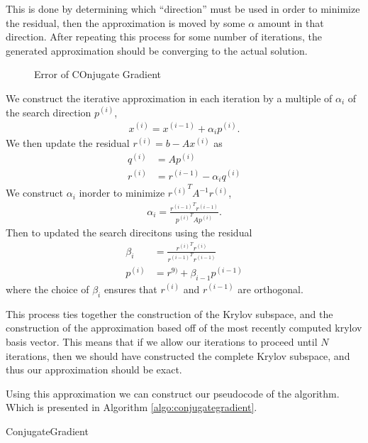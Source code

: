 \documentclass[../fem.tex]{subfile}
\begin{document}
This is done by determining which ``direction'' must be used in order to
minimize the residual, then the approximation is moved by some $\alpha$ amount
in that direction. After repeating this process for some number of iterations,
the generated approximation should be converging to the actual solution.

\begin{figure}[htpb]
  \centering
     
  \caption{Error of COnjugate Gradient}
  \label{fig:cg_err}
\end{figure}

We construct the iterative approximation in each iteration by a multiple of
$\alpha_i$ of the search direction $p^{(i)}$,
\begin{align*}
  x^{(i)}=x^{(i-1)}+\alpha_ip^{(i)}.
\end{align*}
We then update the residual $r^{(i)}=b-Ax^{(i)}$ as
\begin{align*}
  q^{(i)}&=Ap^{(i)}\\
  r^{(i)}&=r^{(i-1)}-\alpha_i q^{(i)}
\end{align*}
We construct $\alpha_i$ inorder to minimize ${r^{(i)}}^TA^{-1}r^{(i)}$,
\begin{align*}
  \alpha_i=\frac{{r^{(i-1)}}^Tr^{(i-1)}}{{p^{(i)}}^TAp^{(i)}}.
\end{align*}
Then to updated the search direcitons using the residual
\begin{align*}
  \beta_i&=\frac{{r^{(i)}}^Tr^{(i)}}{{r^{(i-1)}}^Tr^{(i-1)}}\\
  p^{(i)}&=r^{9)}+\beta_{i-1}p^{(i-1)}
\end{align*}
where the choice of $\beta_i$ ensures that $r^{(i)}$ and $r^{(i-1)}$ are
orthogonal.

This process ties together the construction of the Krylov subspace, and the
construction of the approximation based off of the most recently computed
krylov basis vector. This means that if we allow our iterations to proceed
until $N$ iterations, then we should have constructed the complete Krylov
subspace, and thus our approximation should be exact.

Using this approximation we can construct our pseudocode of the algorithm. Which
is presented in Algorithm \ref{algo:conjugategradient}.

\begin{algorithm}[H]
  \caption{ConjugateGradient}\label{algo:conjugategradient}
  \begin{algorithmic}
    \Else
    \EndIf
    \EndIf
    \EndFor
  \end{algorithmic}
\end{algorithm}
\end{document}
